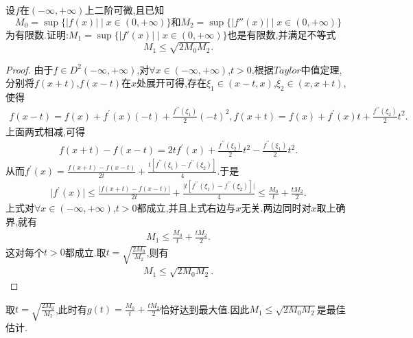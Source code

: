 \documentclass[lang=cn,newtx,10pt,scheme=chinese]{elegantbook}
\begin{document}
\begin{example}\label{example:1.1(由原函数和二阶导数上确界估计一阶导数上确界)(区间为R)}
    设\(f\)在\((-\infty,+\infty)\)上二阶可微,且已知
    \begin{equation}
    M_0=\sup\{\vert f(x)\vert\mid x\in(0,+\infty)\}\text{和}M_2=\sup\{\vert f''(x)\vert\mid x\in(0,+\infty)\}
        \nonumber
    \end{equation}
    为有限数.证明:\(M_1=\sup\{\vert f'(x)\vert\mid x\in(0,+\infty)\}\)也是有限数,并满足不等式
    \begin{equation}
        M_1\leq\sqrt{2M_0M_2}.
        \nonumber
    \end{equation}
\end{example}
\begin{proof}
    由于\(f\in D^2(-\infty,+\infty)\),对\(\forall x\in (-\infty,+\infty)\),\(t > 0\),根据\(Taylor\)中值定理,分别将\(f(x + t)\),\(f(x - t)\)在\(x\)处展开可得,存在\(\xi_1\in (x - t,x)\),\(\xi_2\in (x,x + t)\),使得
    \begin{align*}
    f(x - t) = f(x) + f^{\prime}(x)(-t) + \frac{f^{\prime\prime}(\xi_1)}{2}(-t)^2,
f(x + t) = f(x) + f^{\prime}(x)t + \frac{f^{\prime\prime}(\xi_2)}{2}t^2.
    \end{align*}
上面两式相减,可得
\begin{align*}
   f(x + t) - f(x - t) = 2tf^{\prime}(x) + \frac{f^{\prime\prime}(\xi_2)}{2}t^2 - \frac{f^{\prime\prime}(\xi_1)}{2}t^2.
\end{align*}
从而\(f^{\prime}(x) = \frac{f(x + t) - f(x - t)}{2t} + \frac{t[f^{\prime\prime}(\xi_1) - f^{\prime\prime}(\xi_2)]}{4}\).于是
\begin{align*}
    \vert f^{\prime}(x)\vert\leqslant \frac{\vert f(x + t) - f(x - t)\vert}{2t} + \frac{\vert t[f^{\prime\prime}(\xi_1) - f^{\prime\prime}(\xi_2)]\vert}{4}\leqslant \frac{M_0}{t} + \frac{tM_2}{2}.
\end{align*}
上式对\(\forall x\in (-\infty,+\infty)\),\(t > 0\)都成立,并且上式右边与\(x\)无关.两边同时对\(x\)取上确界,就有
\begin{align*}
    M_1\leqslant \frac{M_0}{t} + \frac{tM_2}{2}.
\end{align*}
这对每个\(t > 0\)都成立.取\(t = \sqrt{\frac{2M_0}{M_2}}\),则有
\begin{align*}
    M_1\leqslant \sqrt{2M_0M_2}.
\end{align*} 
\end{proof}
\begin{remark}
    取\(t = \sqrt{\frac{2M_0}{M_2}}\),此时有\(g(t) = \frac{M_0}{t} + \frac{tM_2}{2}\)恰好达到最大值.因此\(M_1\leqslant \sqrt{2M_0M_2}\)是最佳估计.
\end{remark}
\end{document}
